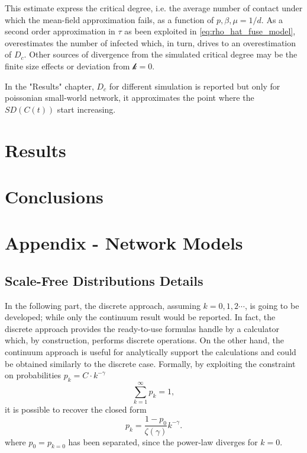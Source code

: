 \documentclass[a4paper,12pt,twoside]{book} %
\theoremstyle{definition}
\begin{document}
This estimate express the critical degree, i.e. the average number of contact under which the mean-field approximation fails, as a function of $p,\beta,\mu = 1/d$. As a second order approximation in $\tau$ as been exploited in \autoref{eq:rho_hat_fuse_model}, overestimates the number of infected which, in turn, drives to an overestimation of $D_c$. Other sources of divergence from the simulated critical degree may be the finite size effects or deviation from $\mathcal{k} = 0$.   

In the "Results" chapter, $D_c$ for different simulation is reported but only for poissonian small-world network, it approximates the point where the $SD(C(t))$ start increasing.


\chapter{Results}
\label{ch:Results}
\chapter{Conclusions}


\appendix
\chapter{Appendix - Network Models}

\section{Scale-Free Distributions Details}
\label{sec:SFD_details}
In the following part, the discrete approach, assuming $k = 0,1,2\cdots$, is going to be developed; while only the continuum result would be reported. In fact, the discrete approach provides the ready-to-use formulas handle by a calculator which, by construction, performs discrete operations. On the other hand, the continuum approach is useful for analytically support the calculations and could be obtained similarly to the discrete case.
Formally, by exploiting the constraint on probabilities $p_k = C\cdot k^{-\gamma}$ \[\sum_{k=1}^{\infty} p_k = 1,\] it is possible to recover the closed form \cite{barabasi::2016networkbook}
\begin{equation}
	p_k = \frac{1-p_0}{\zeta(\gamma)}k^{-\gamma}.
	\label{eq:p_scalefree}
\end{equation}
where $p_0 = p_{k=0}$ has been separated, since the power-law diverges for $k=0$.
\end{document}
